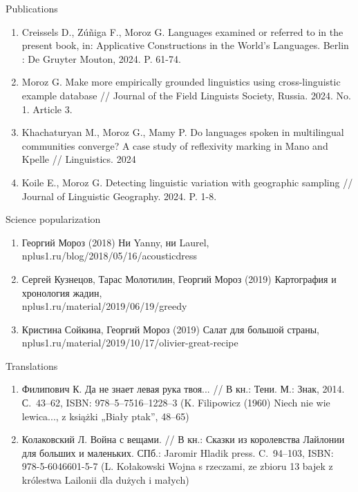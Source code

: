 \documentclass{resume} %
\begin{document}
\begin{rSection}{Publications}
\begin{enumerate}
\item Creissels D., Zúñiga F., Moroz G. Languages examined or referred to in the present book, in: Applicative Constructions in the World's Languages. Berlin : De Gruyter Mouton, 2024. P. 61-74.
\item Moroz G. Make more empirically grounded linguistics using cross-linguistic example database // Journal of the Field Linguists Society, Russia. 2024. No. 1. Article 3.
\item Khachaturyan M., Moroz G., Mamy P. Do languages spoken in multilingual communities converge? A case study of reflexivity marking in Mano and Kpelle // Linguistics. 2024
\item Koile E., Moroz G. Detecting linguistic variation with geographic sampling // Journal of Linguistic Geography. 2024. P. 1-8.
\end{enumerate}
\end{rSection}

\begin{rSection}{Science popularization}
\begin{enumerate}
\item Георгий Мороз (2018)  Ни Yanny, ни Laurel, \\ nplus1.ru/blog/2018/05/16/acousticdress
\item Сергей Кузнецов, Тарас Молотилин, Георгий Мороз (2019) Картография и хронология жадин, \\ nplus1.ru/material/2019/06/19/greedy
\item Кристина Сойкина, Георгий Мороз (2019) Салат для большой страны, \\ nplus1.ru/material/2019/10/17/olivier-great-recipe
\end{enumerate}
\end{rSection}

\begin{rSection}{Translations}
\begin{enumerate}
\item Филипович К. Да не знает левая рука твоя... // В кн.: Тени. М.: Знак, 2014. С.~43--62, ISBN: 978--5--7516--1228--3 (K. Filipowicz (1960) Niech nie wie lewica..., z książki „Biały ptak”, 48--65)
\item Колаковский Л. Война с вещами. // В кн.: Сказки из королевства Лайлонии для больших и маленьких. СПб.: Jaromir Hladik press. C.~94--103, ISBN: 978-5-6046601-5-7 (L. Kołakowski Wojna s rzeczami, ze zbioru 13 bajek z królestwa Lailonii dla dużych i małych)
\end{enumerate}
\end{rSection}





\end{document}
